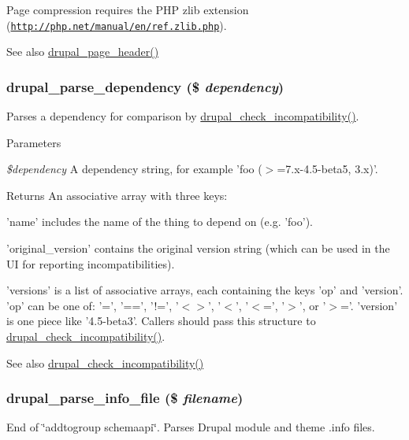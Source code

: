Page compression requires the PHP zlib extension (\href{http://php.net/manual/en/ref.zlib.php}{\tt http://php.net/manual/en/ref.zlib.php}).

\begin{DoxySeeAlso}{See also}
\hyperlink{bootstrap_8inc_a05f3dc0377da7898b9cb53977c30cca6}{drupal\_\-page\_\-header()} 
\end{DoxySeeAlso}
\hypertarget{common_8inc_a4e06efa27b45d3aa8670a8553d0194d6}{
\subsubsection[{drupal\_\-parse\_\-dependency}]{\setlength{\rightskip}{0pt plus 5cm}drupal\_\-parse\_\-dependency (\$ {\em dependency})}}
\label{common_8inc_a4e06efa27b45d3aa8670a8553d0194d6}
Parses a dependency for comparison by \hyperlink{common_8inc_aa2a2d57500dc465711da5ac8e6afd406}{drupal\_\-check\_\-incompatibility()}.


\begin{DoxyParams}{Parameters}
\item[{\em \$dependency}]A dependency string, for example 'foo ($>$=7.x-\/4.5-\/beta5, 3.x)'.\end{DoxyParams}
\begin{DoxyReturn}{Returns}
An associative array with three keys:
\begin{DoxyItemize}
\item 'name' includes the name of the thing to depend on (e.g. 'foo').
\item 'original\_\-version' contains the original version string (which can be used in the UI for reporting incompatibilities).
\item 'versions' is a list of associative arrays, each containing the keys 'op' and 'version'. 'op' can be one of: '=', '==', '!=', '$<$$>$', '$<$', '$<$=', '$>$', or '$>$='. 'version' is one piece like '4.5-\/beta3'. Callers should pass this structure to \hyperlink{common_8inc_aa2a2d57500dc465711da5ac8e6afd406}{drupal\_\-check\_\-incompatibility()}.
\end{DoxyItemize}
\end{DoxyReturn}
\begin{DoxySeeAlso}{See also}
\hyperlink{common_8inc_aa2a2d57500dc465711da5ac8e6afd406}{drupal\_\-check\_\-incompatibility()} 
\end{DoxySeeAlso}
\hypertarget{common_8inc_a277955232059631211fcfde533ea89d6}{
\subsubsection[{drupal\_\-parse\_\-info\_\-file}]{\setlength{\rightskip}{0pt plus 5cm}drupal\_\-parse\_\-info\_\-file (\$ {\em filename})}}
\label{common_8inc_a277955232059631211fcfde533ea89d6}
End of \char`\"{}addtogroup schemaapi\char`\"{}. Parses Drupal module and theme .info files.

